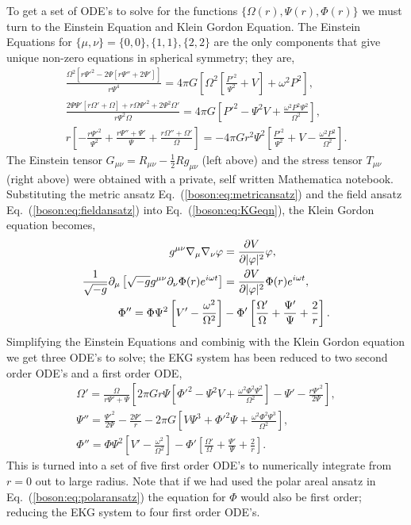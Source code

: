 To get a set of ODE's to solve for the functions $\{\Omega(r), \Psi(r),\Phi(r)\}$ we must turn to the Einstein Equation and Klein Gordon Equation. The Einstein Equations for $\{\mu,\nu\}=\{0,0\},\{1,1\},\{2,2\}$ are the only components that give unique non-zero equations in spherical symmetry; they are,
\begin{gather}
\frac{\Omega ^2 \left[r \Psi '^2-2 \Psi  \left[r \Psi ''+2 \Psi '\right]\right]}{r \Psi ^4} = 4\pi G \left[\Omega ^2 \left[\frac{P'^2}{\Psi ^2}+V\right]+\omega ^2 P^2\right],\\
\frac{2 \Psi  \Psi ' \left[r \Omega '+\Omega \right]+r \Omega  \Psi '^2+2 \Psi ^2 \Omega
   '}{r \Psi ^2 \Omega } = 4\pi G \left[P'^2-\Psi ^2 V+\frac{\omega ^2 P^2 \Psi ^2}{\Omega
   ^2}\right],\\
   r \left[-\frac{r \Psi '^2}{\Psi ^2}+\frac{r \Psi ''+\Psi '}{\Psi }+\frac{r \Omega ''+\Omega
   '}{\Omega }\right] = -4\pi G r^2 \Psi ^2 \left[\frac{P'^2}{\Psi ^2}+V-\frac{\omega ^2 P^2}{\Omega
   ^2}\right].
   \end{gather}
  The Einstein tensor $G_{\mu\nu} = R_{\mu\nu}-\frac{1}{2}R g_{\mu\nu}$ (left above) and the stress tensor $T_{\mu\nu}$ (right above) were obtained with a private, self written Mathematica notebook. Substituting the metric ansatz Eq.~(\ref{boson:eq:metricansatz}) and the field ansatz Eq.~(\ref{boson:eq:fieldansatz}) into Eq.~(\ref{boson:eq:KGeqn}), the Klein Gordon equation becomes,
  \begin{align}
  g^{\mu\nu}\nabla_\mu\nabla_\nu \varphi &= \frac{\partial V}{\partial |\varphi|^2}\varphi ,\\
   \frac{1}{\sqrt{-g}}\partial_\mu \left[ \sqrt{-g}g^{\mu\nu}\partial_\nu \Phi(r)e^{i\omega t}\right] &= \frac{\partial V}{\partial |\varphi|^2} \Phi(r)e^{i\omega t} ,\\
  \Phi'' = \Phi\Psi^2\left[V'-\frac{\omega^2}{\Omega^2}\right] &- \Phi'\left[\frac{\Omega'}{\Omega} +\frac{\Psi'}{\Psi}+\frac{2}{r} \right].
  \end{align}
Simplifying the Einstein Equations and combinig with the Klein Gordon equation we get three ODE's to solve; the EKG system has been reduced to two second order ODE's and a first order ODE,
\begin{gather}
\Omega '=\frac{\Omega}{r\Psi'+\Psi}\left[2 \pi  G r \Psi \left[\Phi'^2 -\Psi^2 
   V+\frac{\omega ^2 \Phi^2 \Psi^2}{\Omega^2} \right]  -\Psi '-\frac{r \Psi '^2}{2 \Psi} \right] \label{boson:eq:EKGODE1}
,\\{ \Psi'' = \frac{\Psi'^2}{2\Psi} - \frac{2\Psi'}{r}-2\pi G \left[V \Psi^3 + \Phi'^2\Psi+ \frac{ \omega^2\Phi^2\Psi^3}{\Omega^2}\right] } \label{boson:eq:EKGODE2}
,\\ \Phi'' = \Phi\Psi^2\left[V'-\frac{\omega^2}{\Omega^2}\right] - \Phi'\left[\frac{\Omega'}{\Omega} +\frac{\Psi'}{\Psi}+\frac{2}{r} \right]. \label{boson:eq:EKGODE3}
\end{gather}
This is turned into a set of five first order ODE's to numerically integrate from $r=0$ out to large radius. Note that if we had used the polar areal ansatz in Eq.~(\ref{boson:eq:polaransatz}) the equation for $\Phi$ would also be first order; reducing the EKG system to four first order ODE's.

